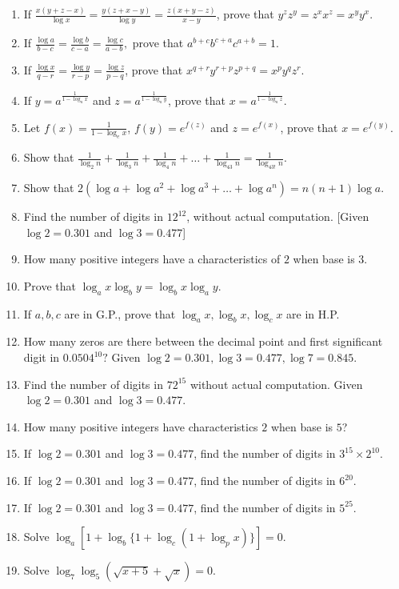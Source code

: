 \begin{enumerate}
\item If $\frac{x(y + z - x)}{\log x} = \frac{y(z + x - y)}{\log y} = \frac{z(x + y - z)}{x - y}$, prove that $y^zz^y = z^xx^z =
  x^yy^x$.
\item If $\frac{\log a}{b - c} = \frac{\log b}{c - a} = \frac{\log c}{a - b},$ prove that $a^{b + c}b^{c + a}c^{a + b} = 1$.
\item If $\frac{\log x}{q - r} = \frac{\log y}{r - p} = \frac{\log z}{p - q}$, prove that $x^{q + r}y^{r + p}z^{p + q} =
  x^py^qz^r$.
\item If $y = a^{\frac{1}{1 - \log _ax}}$ and $z = a^{\frac{1}{1 - \log_ay}}$, prove that $x = a^{\frac{1}{1 - \log_az}}$.
\item Let $f(x) = \frac{1}{1 - \log_ex}$, $f(y) = e^{f(z)}$ and $z = e^{f(x)}$, prove that $x = e^{f(y)}$.
\item Show that $\frac{1}{\log_2n} + \frac{1}{\log_3n} + \frac{1}{\log_4n} + \ldots + \frac{1}{\log_{43}n} =
  \frac{1}{\log_{43!}n}$.
\item Show that $2(\log a + \log a^2 + \log a^3 + \ldots + \log a^n) = n(n + 1)\log a$.
\item Find the number of digits in $12^{12}$, without actual computation. [Given $\log 2 = 0.301$ and $\log 3 = 0.477$]
\item How many positive integers have a characteristics of $2$ when base is $3$.
\item Prove that $\log_ax\log_by = \log_bx\log_ay$.
\item If $a, b, c$ are in G.P., prove that $\log_ax, \log_bx, \log_cx$ are in H.P.
\item How many zeros are there between the decimal point and first significant digit in $0.0504^{10}?$ Given $\log 2 = 0.301, \log
  3 = 0.477, \log 7 = 0.845$.
\item Find the number of digits in $72^{15}$ without actual computation. Given $\log 2 = 0.301$ and $\log  3 = 0.477$.
\item How many positive integers have characteristics $2$ when base is $5$?
\item If $\log 2 = 0.301$ and $\log 3 =0.477$, find the number of digits in $3^{15}\times 2^{10}$.
\item If $\log 2 = 0.301$ and $\log 3 =0.477$, find the number of digits in $6^{20}$.
\item If $\log 2 = 0.301$ and $\log 3 =0.477$, find the number of digits in $5^{25}$.
\item Solve $\log_a[1 + \log_b\{1 + \log_c(1 + \log_px)\}] = 0$.
\item Solve $\log_7\log_5(\sqrt{x + 5} + \sqrt{x}) = 0$.
\end{enumerate}

